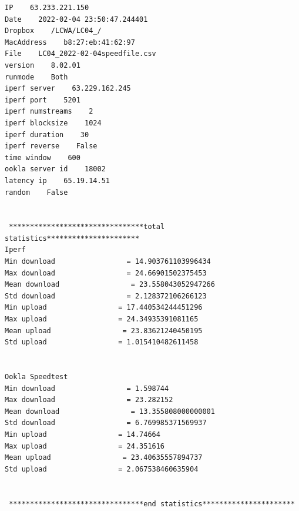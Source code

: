 \documentclass[11pt]{article}
\begin{document}
\begin{verbatim}
IP    63.233.221.150
Date    2022-02-04 23:50:47.244401
Dropbox    /LCWA/LC04_/
MacAddress    b8:27:eb:41:62:97
File    LC04_2022-02-04speedfile.csv
version    8.02.01
runmode    Both
iperf server    63.229.162.245
iperf port    5201
iperf numstreams    2
iperf blocksize    1024
iperf duration    30
iperf reverse    False
time window    600
ookla server id    18002
latency ip    65.19.14.51
random    False


 ********************************total statistics********************** 
Iperf 
Min download                 = 14.903761103996434
Max download                 = 24.66901502375453
Mean download                 = 23.558043052947266
Std download                 = 2.128372106266123
Min upload                 = 17.440534244451296
Max upload                 = 24.34935391081165
Mean upload                 = 23.83621240450195
Std upload                 = 1.015410482611458


Ookla Speedtest 
Min download                 = 1.598744
Max download                 = 23.282152
Mean download                 = 13.355808000000001
Std download                 = 6.769985371569937
Min upload                 = 14.74664
Max upload                 = 24.351616
Mean upload                 = 23.40635557894737
Std upload                 = 2.067538460635904


 ********************************end statistics********************** 


\end{verbatim}
\end{document}
